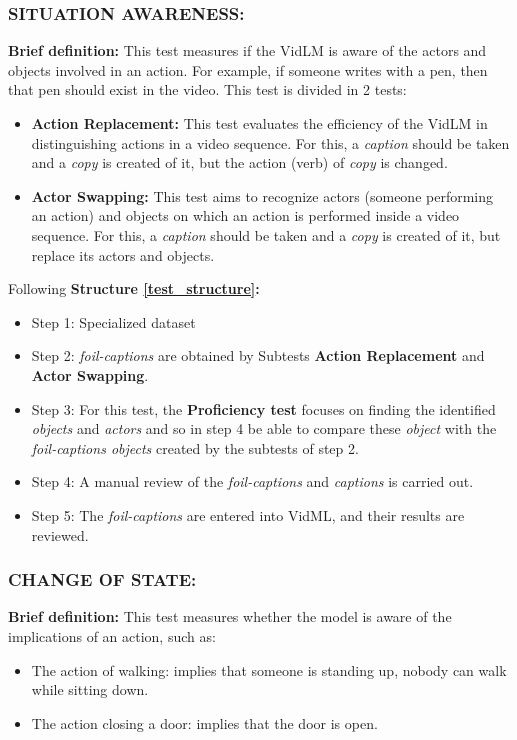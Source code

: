 \subsubsection{SITUATION AWARENESS:}
\textbf{Brief definition:}
This test measures if the VidLM is aware of the actors and objects involved in an action. For example, if someone writes with a pen, then that pen should exist in the video.
This test is divided in 2 tests:
\begin{itemize}
\item \textbf{Action Replacement:} This test evaluates the efficiency of the VidLM in distinguishing actions in a video sequence. For this, a \textit{caption} should be taken and a \textit{copy} is created of it, but the action (verb) of \textit{copy} is changed.
\item \textbf{Actor Swapping:} This test aims to recognize actors (someone performing an action) and objects on which an action is performed inside a video sequence. For this, a \textit{caption} should be taken and a \textit{copy} is created of it, but replace its actors and objects.
\end{itemize}
Following \textbf{Structure \ref{test_structure}:}
\begin{itemize}
\item Step 1: Specialized dataset
\item Step 2: \textit{foil-captions} are obtained by Subtests \textbf{Action Replacement} and \textbf{Actor Swapping}.
\item Step 3: For this test, the \textbf{Proficiency test} focuses on finding the identified \textit{objects} and \textit{actors} and so in step 4 be able to compare these \textit{object} with the \textit{foil-captions objects} created by the subtests of step 2.
\item Step 4: A manual review of the \textit{foil-captions} and \textit{captions} is carried out.
\item Step 5: The \textit{foil-captions} are entered into VidML, and their results are reviewed.
\end{itemize}
\subsubsection{CHANGE OF STATE:}
\textbf{Brief definition:}
This test measures whether the model is aware of the implications of an action, such as:
\begin{itemize}
\item The action of walking: implies that someone is standing up, nobody can walk while sitting down. 
\item The action closing a door: implies that the door is open.
\end{itemize}


